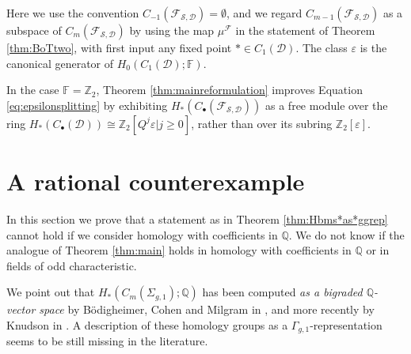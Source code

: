 \documentclass{amsart}
\theoremstyle{plain}
\theoremstyle{definition}
\newcommand{\D}{\mathcal{D}}
\newcommand{\F}{\mathbb{F}}
\newcommand{\cF}{\mathcal{F}}
\newcommand{\Q}{\mathbb{Q}}
\renewcommand{\S}{\mathcal{S}}
\newcommand{\Z}{\mathbb{Z}}
\renewcommand{\gg}{\Gamma_{g,1}}
\newcommand{\pa}[1]{\left(#1\right)}
\renewcommand{\epsilon}{\varepsilon}
\begin{document}
Here we use the convention $C_{-1}(\cF_{\S,\D})=\emptyset$, and we regard $C_{m-1}(\cF_{\S,\D})$ as a subspace of $C_m(\cF_{\S,\D})$ by using the map
$\mu^{\cF}$ in the statement of Theorem \ref{thm:BoTtwo}, with first input any fixed point $*\in C_1(\D)$. The class
$\epsilon$ is the canonical generator of $H_0(C_1(\D);\F)$.

In the case $\F=\Z_2$, Theorem \ref{thm:mainreformulation} improves Equation \ref{eq:epsilonsplitting} by exhibiting
$ H_*\pa{C_{\bullet}(\cF_{\S,\D})}$ as a free module over the ring $H_*(C_{\bullet}(\D))\cong\Z_2[Q^j\epsilon|j\geq 0]$,
rather than over its subring $\Z_2[\epsilon]$.

\section{A rational counterexample}
\label{sec:rational}
In this section we prove that a statement as in Theorem \ref{thm:Hbms*as*ggrep}
cannot hold if we consider homology with coefficients in $\Q$. We do not know
if the analogue of Theorem \ref{thm:main} holds in homology with coefficients in $\Q$
or in fields of odd characteristic.

We point out that $H_*(C_m(\Sigma_{g,1});\Q)$ has been computed \emph{as a bigraded $\Q$-vector space}
by B\"odigheimer, Cohen and Milgram in \cite{BCM}, and more recently by Knudson in \cite{Knudson}. A description of
these homology groups as a
$\gg$-representation seems to be still missing in the literature.
\end{document}
